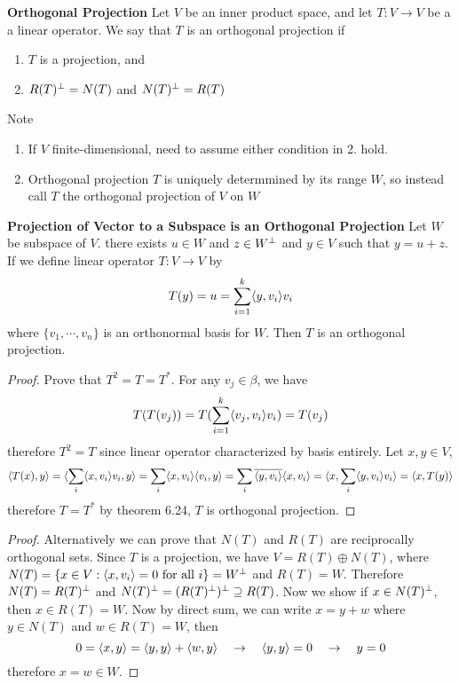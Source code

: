 \documentclass[11pt]{article}
\begin{document}
\begin{defn*}
    \textbf{Orthogonal Projection} Let $V$ be an inner product space, and let $T: V\to V$ be a a linear operator. We say that $T$ is an orthogonal projection if 
    \begin{enumerate}
        \item $T$ is a projection, and
        \item $R(T)^{\perp} = N(T)$ and $N(T)^{\perp} = R(T)$
    \end{enumerate}
    Note
    \begin{enumerate}
        \item If $V$ finite-dimensional, need to assume either condition in 2. hold. 
        \item Orthogonal projection $T$ is uniquely determmined by its range $W$, so instead call $T$ the orthogonal projection of $V$ on $W$
    \end{enumerate}
\end{defn*}

\begin{proposition*}
    \textbf{Projection of Vector to a Subspace is an Orthogonal Projection} Let $W$ be subspace of $V$. there exists $u\in W$ and $z\in W^{\perp}$ and $y\in V$ such that $y=u+z$. If we define linear operator $T: V\rightarrow V$ by 
    \[
        T(y) = u = \sum_{i=1}^k \langle y,v_i\rangle v_i    
    \]
    where $\{v_1, \cdots, v_n\}$ is an orthonormal basis for $W$. Then $T$ is an orthogonal projection.
    \begin{proof}
        Prove that $T^2 = T = T^*$. For any $v_j \in \beta$, we have 
        \[
            T(T(v_j)) = T(\sum_{i=1}^k \langle v_j,v_i\rangle v_i) = T(v_j)
        \]
        therefore $T^2 = T$ since linear operator characterized by basis entirely. Let $x,y\in V$,
        \[
            \langle T(x),y\rangle = \langle\sum_i \langle x,v_i\rangle v_i,y\rangle = \sum_i \langle x,v_i\rangle\langle v_i,y\rangle = \sum_i \overline{\langle y,v_i\rangle} \langle x,v_i\rangle = \langle x,\sum_i \langle y,v_i\rangle v_i\rangle = \langle x,T(y)\rangle
        \]
        therefore $T = T^*$ by theorem 6.24, $T$ is orthogonal projection.
    \end{proof}
    \begin{proof}
        Alternatively we can prove that $N(T)$ and $R(T)$ are reciprocally orthogonal sets. Since $T$ is a projection, we have $V = R(T) \oplus N(T)$, where $N(T) = \{x\in V: \langle x,v_i\rangle = 0 \text{ for all }i\} = W^{\perp}$ and $R(T) = W$. Therefore $N(T) = R(T)^{\perp}$ and $N(T)^{\perp} = (R(T)^{\perp})^{\perp} \supseteq R(T)$. Now we show if $x\in N(T)^{\perp}$, then $x\in R(T) = W$. Now by direct sum, we can write $x = y+w$ where $y\in N(T)$ and $w\in R(T)=W$, then 
        \[
            0 = \langle x,y\rangle = \langle y,y\rangle + \langle w,y\rangle 
            \quad \rightarrow \quad 
            \langle y,y\rangle = 0 
            \quad \rightarrow \quad 
            y = 0
        \]
        therefore $x = w \in W$. 
    \end{proof}
\end{proposition*}
\end{document}
